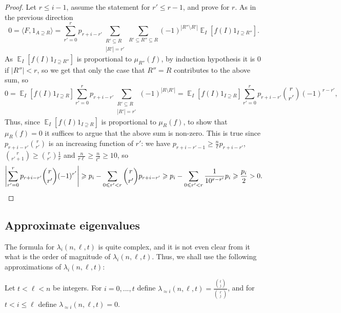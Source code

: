\documentclass{toc}
\newcommand\card[1]{\left| {#1} \right|}
\newcommand\Expect[2]{{\mathop{\mathbb{E}}_{#1}\left[ {#2} \right]}}
\newcommand\inner[2]{\langle{#1},{#2}\rangle}
\renewcommand\geq{\geqslant}
\renewcommand\leq{\leqslant}
\begin{document}
\begin{proof}
Let $r\leq i-1$, assume the statement for $r'\leq r-1$, and prove for $r$. As in the previous direction
\[
0 =
\inner{F}{1_{A\supseteq R}}
=
\sum\limits_{r'=0}^{r}p_{r+i-r'}\sum\limits_{\substack{R'\subseteq R\\ \card{R'} = r'}}\sum\limits_{R'\subseteq R''\subseteq R} (-1)^{\card{R''\setminus R'}} \Expect{I}{f(I) 1_{I\supseteq R''}}.
\]
As $\Expect{I}{f(I) 1_{I\supseteq R''}}$ is proportional to $\mu_{R''}(f)$, by induction hypothesis it is $0$ if $\card{R''}<r$, so we get that only
the case that $R'' = R$ contributes to the above sum, so
\[
0
= \Expect{I}{f(I) 1_{I\supseteq R}} \sum\limits_{r'=0}^{r}p_{r+i-r'}\sum\limits_{\substack{R'\subseteq R\\ \card{R'} = r'}}(-1)^{\card{R\setminus R'}}
= \Expect{I}{f(I) 1_{I\supseteq R}} \sum\limits_{r'=0}^{r}p_{r+i-r'}\binom{r}{r'}(-1)^{r-r'},
\]
Thus, since $\Expect{I}{f(I) 1_{I\supseteq R}}$ is proportional to $\mu_R(f)$, to show that $\mu_R(f) = 0$ it suffices to argue that the above sum is non-zero.
This is true since $p_{r+i-r'}\binom{r}{r'}$ is an increasing function of $r'$: we have $p_{r+i-r'-1}\geq \frac{n}{\ell} p_{r+i-r'}$,
$\binom{r}{r'+1}\geq \binom{r}{r'} \frac{1}{r}$ and $\frac{n}{r\ell} \geq \frac{n}{\ell^2}\geq 10$, so
\[
\card{\sum\limits_{r'=0}^{r}p_{r+i-r'}\binom{r}{r'}(-1)^{r'}}
\geq p_i - \sum\limits_{0\leq r'<r} \binom{r}{r'}p_{r+i-r'}
\geq p_i - \sum\limits_{0\leq r'<r} \frac{1}{10^{r-r'}}p_i
\geq \frac{p_i}{2} > 0.\qedhere      %
\]
\end{proof}




\subsection{Approximate eigenvalues}
The formula for $\lambda_i(n,\ell,t)$ is quite complex, and it is not even clear from it what is
the order of magnitude of $\lambda_i(n,\ell,t)$.
Thus, we shall use the following approximations of $\lambda_i(n,\ell,t)$:
\begin{definition}
Let $t<\ell<n$ be integers. For $i=0,...,t$ define $\lambda_{\approx i}(n,\ell,t) = \frac{{t\choose j}}{{\ell\choose j}}$,
and for $t<i\leq \ell$ define $\lambda_{\approx i}(n,\ell,t) = 0$.
\end{definition}
\end{document}
